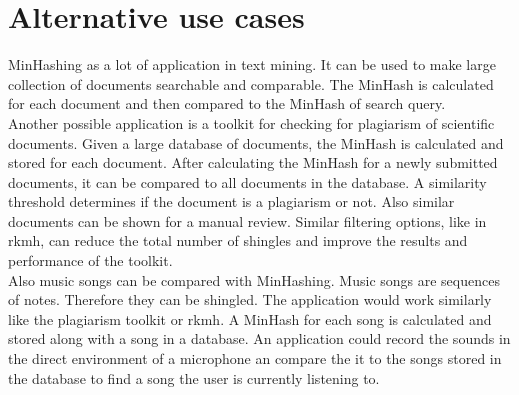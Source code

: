 \section{Alternative use cases}

MinHashing as a lot of application in text mining. It can be used to make large collection of documents searchable and comparable. The MinHash is calculated for each document and then compared to the MinHash of search query.\\

Another possible application is a toolkit for checking for plagiarism of scientific documents. Given a large database of documents, the MinHash is calculated and stored for each document. After calculating the MinHash for a newly submitted documents, it can be compared to all documents in the database. A similarity threshold determines if the document is a plagiarism or not. Also similar documents can be shown for a manual review. Similar filtering options, like in rkmh, can reduce the total number of shingles and improve the results and performance of the toolkit.\\

Also music songs can be compared with MinHashing. Music songs are sequences of notes. Therefore they can be shingled. The application would work similarly like the plagiarism toolkit or rkmh. A MinHash for each song is calculated and stored along with a song in a database. An application could record the sounds in the direct environment of a microphone an compare the it to the songs stored in the database to find a song the user is currently listening to.\\